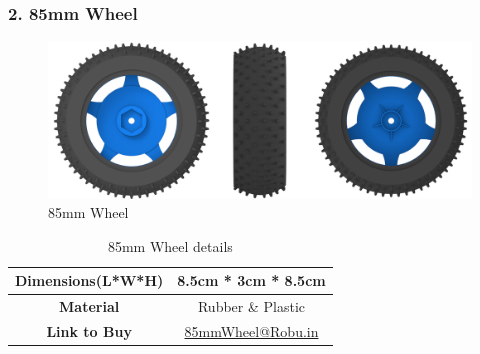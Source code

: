 \documentclass[12pt,a4paper,oneside]{book}
\begin{document}
			\subsubsection*{2. 85mm Wheel}
				\begin{figure}[H]
					\centering
					\includegraphics[scale=1]{Wheel FULL}
					\caption{85mm Wheel}	 
				\end{figure}
				\begin{table}[H]
					\centering
					\def\arraystretch{1.2}
					\caption{85mm Wheel details}
					\vspace{0.5cm}
					\begin{tabular}{|c||c|}
					\hline
						\textbf{Dimensions(L*W*H)} & 8.5cm * 3cm * 8.5cm\\\hline
						\textbf{Material}  & Rubber \& Plastic\\\hline
						\textbf{Link to Buy} & \href{https://robu.in/product/85mm-large-robot-smart-car-wheel-38mm-width-surface-blue/}{85mmWheel@Robu.in}\\\hline
					\end{tabular}
				\end{table}
				\pagebreak
				
\end{document}
